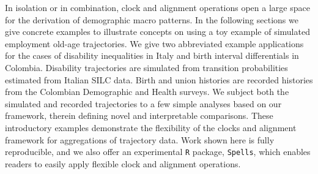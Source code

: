 \documentclass{article}
\begin{document}
In isolation or in combination, clock and alignment operations open a large space for the derivation of demographic macro patterns. In the following sections we give concrete examples to illustrate concepts on using a toy example of simulated employment old-age trajectories. We give two abbreviated example applications for the cases of disability inequalities in Italy and birth interval differentials in Colombia. Disability trajectories are simulated from transition probabilities estimated from Italian SILC data. Birth and union histories are recorded histories from the Colombian Demographic and Health surveys. We subject both the simulated and recorded trajectories to a few simple analyses based on our framework, therein defining novel and interpretable comparisons. These introductory examples demonstrate the flexibility of the clocks and alignment framework for aggregations of trajectory data. Work shown here is fully reproducible, and we also offer an experimental \texttt{R} package, \texttt{Spells}, which enables readers to easily apply flexible clock and alignment operations.
% 

\end{document}
